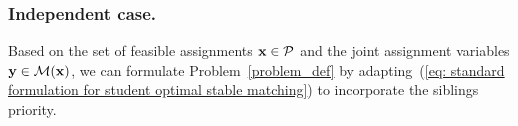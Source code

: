         \subsubsection{Independent case.}
            Based on the set of feasible assignments \(\mathbf{x}\in \mathcal{P}\) and the joint assignment variables \(\mathbf{y} \in \mathcal{M}(\mathbf{x})\), we can formulate Problem~\ref{problem_def} by adapting~(\ref{eq: standard formulation for student optimal stable matching}) to incorporate the siblings priority.
